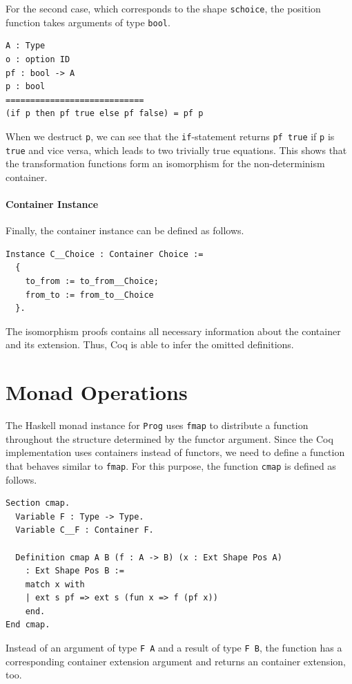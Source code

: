 \documentclass[a4paper, 11pt, fleqn, twoside, abstract=on]{scrreprt}
\newcommand{\hinl}[1]{\texttt{#1}}
\newcommand{\cinl}[1]{\texttt{#1}}
\begin{document}
For the second case, which corresponds to the shape \cinl{schoice}, the position function takes arguments of type \cinl{bool}.

\begin{verbatim}
A : Type
o : option ID
pf : bool -> A
p : bool
============================
(if p then pf true else pf false) = pf p
\end{verbatim}
\noindent
When we destruct \hinl{p}, we can see that the \cinl{if}-statement returns \cinl{pf true} if \cinl{p} is \cinl{true} and vice versa, which leads to two trivially true equations.
This shows that the transformation functions form an isomorphism for the non-determinism container.

\paragraph{Container Instance}
Finally, the container instance can be defined as follows.

\begin{verbatim}
Instance C__Choice : Container Choice :=
  {
    to_from := to_from__Choice;
    from_to := from_to__Choice
  }.
\end{verbatim}
\noindent
The isomorphism proofs contains all necessary information about the container and its extension.
Thus, Coq is able to infer the omitted definitions.

\section{Monad Operations}
The Haskell monad instance for \hinl{Prog} uses \hinl{fmap} to distribute a function throughout the structure determined by the functor argument.
Since the Coq implementation uses containers instead of functors, we need to define a function that behaves similar to \hinl{fmap}.
For this purpose, the function \cinl{cmap} is defined as follows.

\begin{verbatim}
Section cmap.
  Variable F : Type -> Type.
  Variable C__F : Container F.

  Definition cmap A B (f : A -> B) (x : Ext Shape Pos A) 
    : Ext Shape Pos B :=
    match x with
    | ext s pf => ext s (fun x => f (pf x))
    end.
End cmap.
\end{verbatim}
\noindent
Instead of an argument of type \cinl{F A} and a result of type \cinl{F B}, the function has a corresponding container extension argument and returns an container extension, too.
\end{document}
